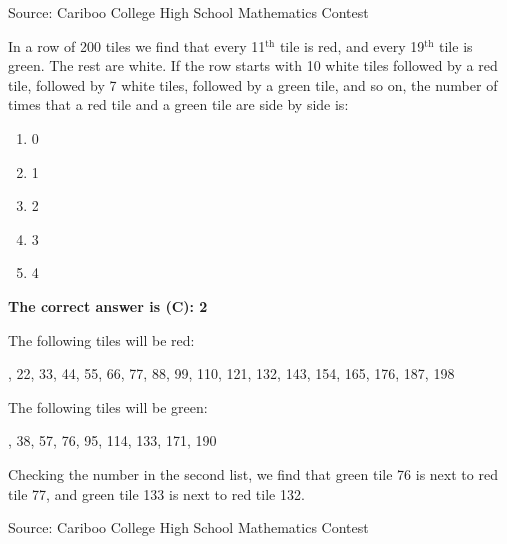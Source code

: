 \documentclass{article}
\begin{document}
\vskip 1.5cm


\scriptsize
Source: Cariboo College High School Mathematics Contest

\normalsize
In a row of 200 tiles we find that every 11$^{\text{th}}$ tile is red, and every 19$^{\text{th}}$ tile is green. The rest are white. If the row starts with 10 white tiles followed by a red tile, followed by 7 white tiles, followed by a green tile, and so on, the number of times that a red tile and a green tile are side by side is:
\begin{enumerate}[noitemsep,topsep=0mm,leftmargin=*,widest=D,label=\Alph*)]
	\item 0
	\item 1
	\item 2
	\item 3
	\item 4
\end{enumerate}

\textbf{The correct answer is (C): 2}

The following tiles will be red:

{, 22, 33, 44, 55, 66, 77, 88, 99, 110, 121, 132, 143, 154, 165, 176, 187, 198 \par}

The following tiles will be green:

{, 38, 57, 76, 95, 114, 133, 171, 190 \par}

Checking the number in the second list, we find that green tile 76 is next to red tile 77, and green tile 133 is next to red tile 132.

\vskip 1.5cm


\scriptsize
Source: Cariboo College High School Mathematics Contest
\end{document}
